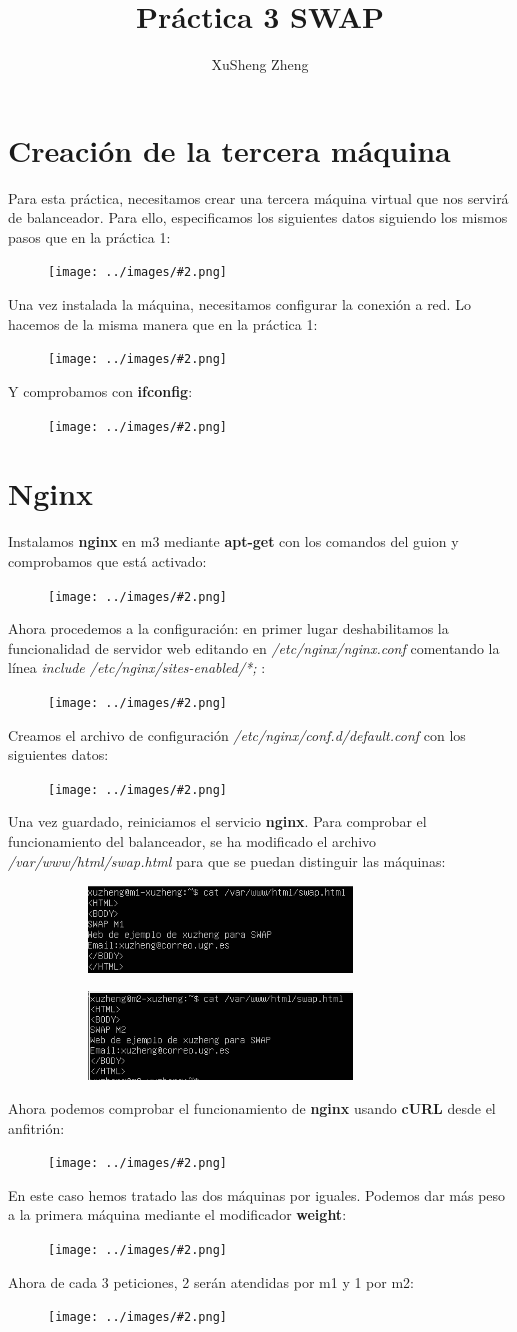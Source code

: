 \documentclass[twoside]{article}
\title{Práctica 3 SWAP}
\author{XuSheng Zheng}
\date{}
\newcommand{\image}[2]{
\begin{figure}[H]
    \texttt{[image: ../images/\#2.png]}
    \centering
\end{figure}
}
\begin{document}
\maketitle
\tableofcontents
\newpage

\section{Creación de la tercera máquina}
Para esta práctica, necesitamos crear una tercera máquina virtual que nos servirá de balanceador. Para ello, especificamos los siguientes datos siguiendo los mismos pasos que en la práctica 1:
\image{8}{1}
Una vez instalada la máquina, necesitamos configurar la conexión a red. Lo hacemos de la misma manera que en la práctica 1:
\image{8}{2}
Y comprobamos con \textbf{ifconfig}:
\image{8}{3}


\section{Nginx}
Instalamos \textbf{nginx} en m3 mediante \textbf{apt-get} con los comandos del guion y comprobamos que está activado:
\image{8}{4}
Ahora procedemos a la configuración: en primer lugar deshabilitamos la funcionalidad de servidor web editando en \textit{/etc/nginx/nginx.conf} comentando la línea \textit{include /etc/nginx/sites-enabled/*;} :
\image{8}{5}
Creamos el archivo de configuración \textit{/etc/nginx/conf.d/default.conf} con los siguientes datos:
\image{8}{6}
Una vez guardado, reiniciamos el servicio \textbf{nginx}. Para comprobar el funcionamiento del balanceador, se ha modificado el archivo \textit{/var/www/html/swap.html} para que se puedan distinguir las máquinas:
\begin{figure}[H]
    \centering
    \begin{subfigure}{.5\textwidth}
        \centering
        \includegraphics[width=7cm]{../images/10.png}
    \end{subfigure}%
    \begin{subfigure}{.5\textwidth}
        \centering
        \includegraphics[width=7cm]{../images/11.png}
    \end{subfigure}
\end{figure}
Ahora podemos comprobar el funcionamiento de \textbf{nginx} usando \textbf{cURL} desde el anfitrión:
\image{8}{7}
En este caso hemos tratado las dos máquinas por iguales. Podemos dar más peso a la primera máquina mediante el modificador \textbf{weight}:
\image{8}{8}
Ahora de cada 3 peticiones, 2 serán atendidas por m1 y 1 por m2:
\image{8}{9}
\end{document}
